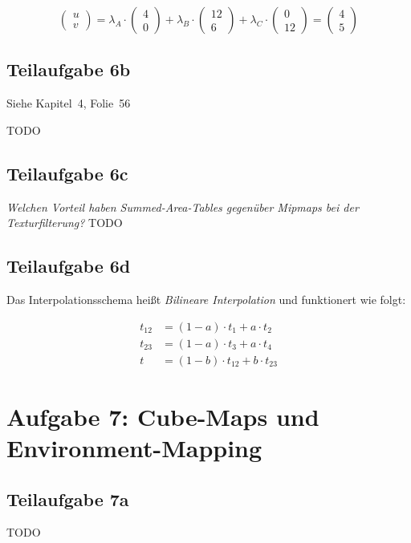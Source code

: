\documentclass[a4paper]{scrartcl}
\begin{document}
\begin{equation}
\begin{pmatrix}u\\v\end{pmatrix} = \lambda_A \cdot \begin{pmatrix}4\\0\end{pmatrix} + \lambda_B \cdot \begin{pmatrix}12\\6\end{pmatrix} + \lambda_C \cdot \begin{pmatrix}0\\12\end{pmatrix} = \begin{pmatrix}4\\5\end{pmatrix}
\end{equation}


\subsection*{Teilaufgabe 6b}
Siehe Kapitel~4, Folie~56

TODO


\subsection*{Teilaufgabe 6c}
\textit{Welchen Vorteil haben Summed-Area-Tables gegenüber Mipmaps bei der Texturfilterung?}
TODO

\subsection*{Teilaufgabe 6d}
Das Interpolationsschema heißt \textit{Bilineare Interpolation} und funktionert
wie folgt:

\begin{align}
    t_{12} &= (1-a) \cdot t_1 + a \cdot t_2\\
    t_{23} &= (1-a) \cdot t_3 + a \cdot t_4\\
    t      &= (1-b) \cdot t_{12} + b \cdot t_{23}
\end{align}

\section*{Aufgabe 7: Cube-Maps und Environment-Mapping}
\subsection*{Teilaufgabe 7a}
TODO
\end{document}
